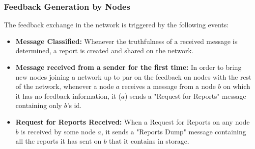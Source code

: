 \documentclass[journal]{IEEEtran}
\begin{document}
\subsubsection{Feedback Generation by Nodes}
The feedback exchange in the network is triggered by the following events:
\begin{itemize}
	\item \textbf{Message Classified:} Whenever the truthfulness of a received message is determined, a report is created and shared on the network.
	\item \textbf{Message received from a sender for the first time:} In order to bring new nodes joining a network up to par on the feedback on nodes with the rest of the network, whenever a node $ a $ receives a message from a node $ b $ on which it has no feedback information, it ($ a $) sends a "Request for Reports" message containing only $ b $'s id.
	\item \textbf{Request for Reports Received:} When a Request for Reports on any node $ b $ is received by some node $ a $, it sends a "Reports Dump" message containing all the reports it has sent on $ b $ that it contains in storage.
\end{itemize}
\end{document}
